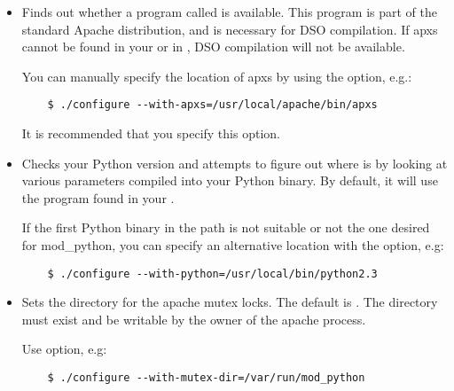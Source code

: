 \begin{itemize}

\item
  Finds out whether a program called  is available. This
  program is part of the standard Apache distribution, and is necessary
  for DSO compilation. If apxs cannot be found in your  or in
  , DSO compilation will not be available.

  You can manually specify the location of apxs by using the
   option, e.g.:

  \begin{verbatim}
    $ ./configure --with-apxs=/usr/local/apache/bin/apxs        
  \end{verbatim}

  It is recommended that you specify this option.

\item
  Checks your Python version and attempts to figure out where
   is by looking at various parameters compiled into
  your Python binary. By default, it will use the 
  program found in your .

  If the first Python binary in the path is not suitable or not the one
  desired for mod_python, you can specify an alternative location with the
   option, e.g:

  \begin{verbatim}
    $ ./configure --with-python=/usr/local/bin/python2.3
  \end{verbatim}                      

\item
  Sets the directory for the apache mutex locks. The default is
  . The directory must exist and be writable by the
  owner of the apache process.

  Use  option, e.g:

  \begin{verbatim}
    $ ./configure --with-mutex-dir=/var/run/mod_python
  \end{verbatim}                      


\end{itemize}
